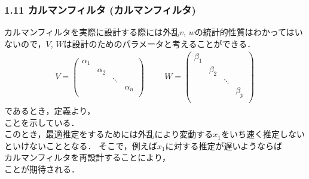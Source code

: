 \begin{frame}[t]
\frametitle{1.11 カルマンフィルタ (カルマンフィルタ)}
カルマンフィルタを実際に設計する際には外乱$v$, $w$の統計的性質はわかってはいないので，$V$, $W$は設計のためのパラメータと考えることができる．
\begin{align}
  V =    \left(
      \begin{array}{cccc}
        \alpha_1 & & & \\
        & \alpha_2 & & \\
        & & \ddots & \\
        & & & \alpha_n \\
      \end{array}
    \right)
\hspace{1cm}
  W =    \left(
      \begin{array}{cccc}
        \beta_1 & & & \\
        & \beta_2 & & \\
        & & \ddots & \\
        & & & \beta_p \\
      \end{array}
    \right)
\end{align}
であるとき，定義より，\\
ことを示している．\\
このとき，最適推定をするためには外乱により変動する$x_1$をいち速く推定しないといけないこととなる．
そこで，例えば$x_1$に対する推定が遅いようならば\\
 カルマンフィルタを再設計することにより，\\
 ことが期待される．
\end{frame}


